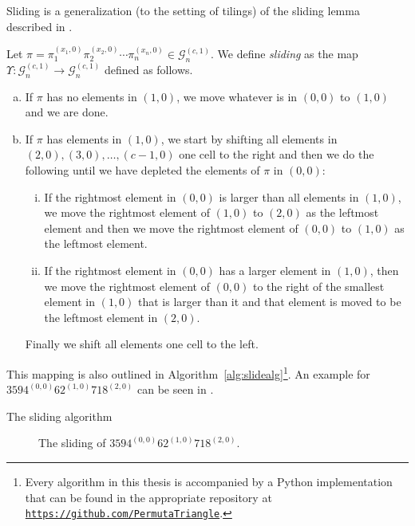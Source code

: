 Sliding is a generalization (to the setting of tilings) of the sliding lemma described in \citeauthor{slide} \cite[Lemma 2.2]{slide}.

\begin{definition}
Let $\pi = \pi_1^{(x_1,0)}\pi_2^{(x_2,0)}\cdots\pi_n^{(x_n,0)} \in \mathcal{G}^{(c,1)}_n$. We define \emph{sliding} as the map $\Upsilon: \mathcal{G}^{(c,1)}_n \to \mathcal{G}^{(c,1)}_n$ defined as follows.
\begin{enumerate}[a)]
    \item If $\pi$ has no elements in $(1,0)$, we move whatever is in $(0,0)$ to $(1,0)$ and we are done.
    \item If $\pi$ has elements in $(1,0)$, we start by shifting all elements in $(2,0), (3,0), \dotsc, (c-1,0)$ one cell to the right and then we do the following until we have depleted the elements of $\pi$ in $(0,0)$:
    \begin{enumerate}[i.]
        \item If the rightmost element in $(0,0)$ is larger than all elements in $(1,0)$, we move the rightmost element of $(1,0)$ to $(2,0)$ as the leftmost element and then we move the rightmost element of $(0,0)$ to $(1,0)$ as the leftmost element.
        \item If the rightmost element in $(0,0)$ has a larger element in $(1,0)$, then we move the rightmost element of $(0,0)$ to the right of the smallest element in $(1,0)$ that is larger than it and that element is moved to be the leftmost element in $(2,0)$.
    \end{enumerate}
    Finally we shift all elements one cell to the left.
\end{enumerate}
\end{definition}

This mapping is also outlined in Algorithm~\ref{alg:slidealg}\footnote{Every algorithm in this thesis is accompanied by a Python implementation that can be found in the appropriate repository at \texttt{\href{https://github.com/PermutaTriangle}{https://github.com/PermutaTriangle}}.}. An example for $3594^{(0,0)}62^{(1,0)}718^{(2,0)}$ can be seen in .

\begin{algorithm}

\caption{The sliding algorithm}
\label{alg:slidealg}
\end{algorithm}

\begin{figure}[ht!]
    \centering
    
    \caption{The sliding of $3594^{(0,0)}62^{(1,0)}718^{(2,0)}$.}
    \label{fig:slide_gp_example}
\end{figure}

